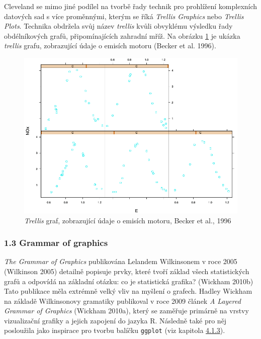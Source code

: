 \documentclass[12pt,]{article}
\begin{document}
\qquad Cleveland se mimo jiné podílel na tvorbě řady technik pro
prohlížení komplexních datových sad s více proměnnými, kterým se říká
\textit{Trellis Graphics} nebo \textit{Trellis Plots}. Technika obdržela
svůj název \textit{trellis} kvůli obvyklému výsledku řady obdélníkových
grafů, připomínajících zahradní mříž. Na obrázku \ref{fig:ch1.8} je
ukázka \emph{trellis} grafu, zobrazující údaje o emisích motoru (Becker
et al. 1996).

\begin{figure}[H]
\centering
    \includegraphics[height = 0.4\textheight]{fig/trellis}
    \caption{\textit{Trellis} graf, zobrazující údaje o emisích motoru, Becker et al., 1996}
    \label{fig:ch1.8}
 \end{figure}

\newpage

\hypertarget{gg}{\subsubsection{1.3 Grammar of graphics}\label{gg}}

\vspace*{-0.35cm} \qquad \textit{The Grammar of Graphics} publikována
Lelandem Wilkinsonem v roce 2005 (Wilkinson 2005) detailně popisuje
prvky, které tvoří základ všech statistických grafů a odpovídá na
základní otázku: co je statistická grafika? (Wickham 2010b) Tato
publikace měla extrémně velký vliv na myšlení o grafech. Hadley Wickham
na základě Wilkinsonovy gramatiky publikoval v roce 2009 článek \emph{A
Layered Grammar of Graphics} (Wickham 2010a), který se zaměřuje primárně
na vrstvy vizualizační grafiky a jejich zapojení do jazyka R. Následně
také pro něj posloužila jako inspirace pro tvorbu balíčku
\texttt{ggplot} (viz kapitola \protect\hyperlink{ggplot}{4.1.3}).
\end{document}
